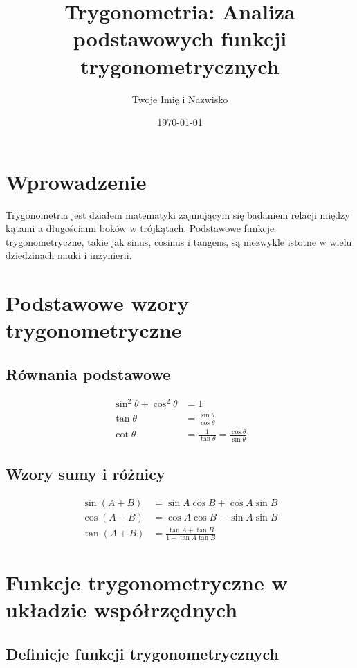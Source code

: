 \documentclass{article}
\title{Trygonometria: Analiza podstawowych funkcji trygonometrycznych}
\author{Twoje Imię i Nazwisko}
\date{\today}
\begin{document}
\maketitle

\section{Wprowadzenie}

Trygonometria jest działem matematyki zajmującym się badaniem relacji między kątami a długościami boków w trójkątach. Podstawowe funkcje trygonometryczne, takie jak sinus, cosinus i tangens, są niezwykle istotne w wielu dziedzinach nauki i inżynierii.

\section{Podstawowe wzory trygonometryczne}

\subsection{Równania podstawowe}

\begin{align}
    \sin^2 \theta + \cos^2 \theta &= 1 \\
    \tan \theta &= \frac{\sin \theta}{\cos \theta} \\
    \cot \theta &= \frac{1}{\tan \theta} = \frac{\cos \theta}{\sin \theta}
\end{align}

\subsection{Wzory sumy i różnicy}

\begin{align}
    \sin(A + B) &= \sin A \cos B + \cos A \sin B \\
    \cos(A + B) &= \cos A \cos B - \sin A \sin B \\
    \tan(A + B) &= \frac{\tan A + \tan B}{1 - \tan A \tan B}
\end{align}

\section{Funkcje trygonometryczne w układzie współrzędnych}

\subsection{Definicje funkcji trygonometrycznych}
\end{document}

